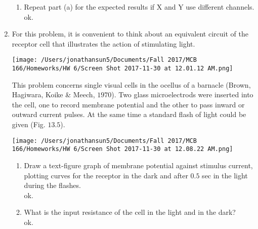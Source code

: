 \documentclass[11pt]{article}
\begin{document}
\begin{enumerate}[label=\arabic*.]
\begin{enumerate}[label=(\alph*)]
\item
Repeat part (a) for the expected results if X and Y use different channels.
\vspace*{1\baselineskip}
\\
ok.













\end{enumerate}



\newpage
\item
For this problem, it is convenient to think about an equivalent circuit of the receptor cell that illustrates the action of stimulating light.
\begin{center}
\texttt{[image: /Users/jonathansun5/Documents/Fall 2017/MCB 166/Homeworks/HW 6/Screen Shot 2017-11-30 at 12.01.12 AM.png]}
\end{center}
This problem concerns single visual cells in the ocellus of a barnacle (Brown, Hagiwara, Koike \& Meech, $1970$). Two glass microelectrods were inserted into the cell, one to record membrane potential and the other to pass inward or outward current pulses. At the same time a standard flash of light could be given (Fig. $13.5$).
\begin{center}
\texttt{[image: /Users/jonathansun5/Documents/Fall 2017/MCB 166/Homeworks/HW 6/Screen Shot 2017-11-30 at 12.08.22 AM.png]}
\end{center}
\begin{enumerate}[label=(\alph*)]
\item
Draw a text-figure graph of membrane potential against stimulus current, plotting curves for the receptor in the dark and after $0.5$ sec in the light during the flashes.
\vspace*{1\baselineskip}
\\
ok.












\item
What is the input resistance of the cell in the light and in the dark?
\vspace*{1\baselineskip}
\\
ok.













\end{enumerate}
\end{enumerate}
\end{document}
